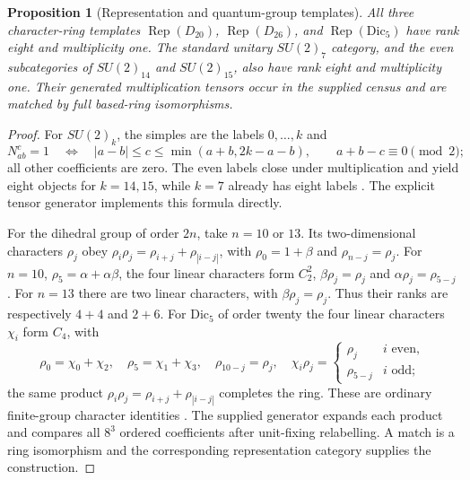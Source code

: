\documentclass[11pt,reqno]{amsart}
\newtheorem{proposition}[theorem]{Proposition}
\theoremstyle{definition}
\theoremstyle{remark}
\newcommand{\Rep}{\operatorname{Rep}}
\begin{document}
\begin{proposition}[Representation and quantum-group templates]\label{prop:models}
All three character-ring templates $\Rep(D_{20})$, $\Rep(D_{26})$, and $\Rep(\mathrm{Dic}_5)$ have rank eight and multiplicity one. The standard unitary $SU(2)_7$ category, and the even subcategories of $SU(2)_{14}$ and $SU(2)_{15}$, also have rank eight and multiplicity one. Their generated multiplication tensors occur in the supplied census and are matched by full based-ring isomorphisms.
\end{proposition}
\begin{proof}
For $SU(2)_k$, the simples are the labels $0,\dots,k$ and
\[
N_{ab}^{c}=1\quad\Longleftrightarrow\quad
|a-b|\leq c\leq\min(a+b,2k-a-b),\qquad a+b-c\equiv0\pmod2;
\]
all other coefficients are zero. The even labels close under multiplication and yield eight objects for $k=14,15$, while $k=7$ already has eight labels \cite{KO}. The explicit tensor generator implements this formula directly.

For the dihedral group of order $2n$, take $n=10$ or $13$. Its two-dimensional characters $\rho_j$ obey $\rho_i\rho_j=\rho_{i+j}+\rho_{|i-j|}$, with $\rho_0=1+\beta$ and $\rho_{n-j}=\rho_j$. For $n=10$, $\rho_5=\alpha+\alpha\beta$, the four linear characters form $C_2^2$, $\beta\rho_j=\rho_j$ and $\alpha\rho_j=\rho_{5-j}$. For $n=13$ there are two linear characters, with $\beta\rho_j=\rho_j$. Thus their ranks are respectively $4+4$ and $2+6$. For $\mathrm{Dic}_5$ of order twenty the four linear characters $\chi_i$ form $C_4$, with
\[
\rho_0=\chi_0+\chi_2,\quad \rho_5=\chi_1+\chi_3,
\quad\rho_{10-j}=\rho_j,\quad
\chi_i\rho_j=\begin{cases}\rho_j&i\text{ even},\\\rho_{5-j}&i\text{ odd};\end{cases}
\]
the same product $\rho_i\rho_j=\rho_{i+j}+\rho_{|i-j|}$ completes the ring. These are ordinary finite-group character identities \cite{Serre}. The supplied generator expands each product and compares all $8^3$ ordered coefficients after unit-fixing relabelling. A match is a ring isomorphism and the corresponding representation category supplies the construction.
\end{proof}
\end{document}
